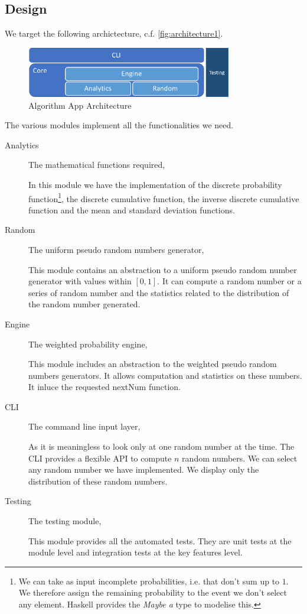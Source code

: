 \documentclass[12pt,a4paper,article]{memoir} %
\begin{document}
\subsection{Design}
We target the following archictecture, c.f. \autoref{fig:architecture1}.
\begin{figure}[h!]
\begin{center}
\includegraphics[width=0.8\textwidth]{img/architecture1.png}
\caption{Algorithm App Architecture}
\label{fig:architecture1}
\end{center}
\end{figure}
The various modules implement all the functionalities we need.
\begin{description}
	\item[Analytics] The mathematical functions required,
	
	In this module we have the implementation of the discrete 
	probability function\footnote{
	We can take as input incomplete probabilities, i.e. that
	don't sum up to $1$. We therefore assign the remaining
	probability to the event we don't select any element.
	Haskell provides the \emph{Maybe a} type to modelise this.
	}, the discrete cumulative function, 
	the inverse discrete cumulative function and the mean and
	standard deviation functions.
	
	\item[Random]	The uniform pseudo random numbers generator,
	
	This module contains an abstraction to a uniform pseudo
	random number generator with values within $ \left[ 0, 1 \right]$.
	It can compute a random number or a series of random 
	number and the statistics related to the distribution of 
	the random number generated.
	\item[Engine] 	The weighted probability engine,
	
	This module includes an abstraction to the weighted 
	pseudo random numbers generators.
	It allows computation and statistics on these numbers.
	It inluce the requested nextNum function.
	\item[CLI] 		The command line input layer,
	
	As it is meaningless to look only at one random number at the time.
	The CLI provides a flexible API to compute $n$ random numbers.
	We can select any random number we have implemented.
	We display only the distribution of these random numbers.
	\item[Testing] 	The testing module,
	
	This module provides all the automated tests. They are unit 
	tests at the module level and integration tests at the key
	features level.
\end{description}
\end{document}
